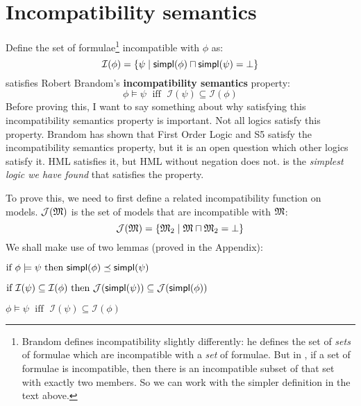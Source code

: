 \section{Incompatibility semantics}\label{incompatibility}

\NI Define the set of formulae\footnote{Brandom \cite{brandom} defines
  incompatibility slightly differently: he defines the set of
  \emph{sets} of formulae which are incompatible with a \emph{set} of
  formulae.  But in \ELABR{}, if a set of formulae is incompatible, then
  there is an incompatible subset of that set with exactly two
  members.  So we can work with the simpler definition in the text
  above.}  incompatible with $\phi$ as:
\[
\mathcal{I}(\phi) = \{ \psi \; | \; \mathsf{simpl}(\phi) \sqcap \mathsf{simpl}(\psi) = \bot \}
\]
\ELABR{} satisfies Robert Brandom's \textbf{incompatibility semantics}  property:
\[
\phi \models \psi \; \mbox{ iff } \; \mathcal{I}(\psi) \subseteq \mathcal{I}(\phi)
\]
Before proving this, I want to say something about why satisfying this incompatibility semantics property is important.
Not all logics satisfy this property. 
Brandom has shown that First Order Logic and S5 satisfy the incompatibility semantics property, but it is an open question which other logics satisfy it.
HML satisfies it, but HML without negation does not.
\ELABR{} is the \emph{simplest logic we have found} that satisfies the property.

To prove this, we need to first define a related incompatibility function on  models.
$\mathcal{J}(\frak{M})$ is the set of models that are incompatible with $\frak{M}$:
\[
\mathcal{J}(\frak{M}) = \{ \frak{M}_2 \; | \; \frak{M} \sqcap \frak{M}_2 = \bot \}
\]
We shall make use of two lemmas (proved in the Appendix):
\begin{lemma}
\label{inc1}
$\mbox{if }\phi \models \psi \mbox{ then } \mathsf{simpl}(\phi) \preceq \mathsf{simpl}(\psi)$
\end{lemma}
\begin{lemma}
\label{inc3}
$\mbox{if }\mathcal{I}(\psi) \subseteq \mathcal{I}(\phi) \mbox{ then } \mathcal{J}(\mathsf{simpl}(\psi)) \subseteq \mathcal{J}(\mathsf{simpl}(\phi))$
\end{lemma}

\begin{theorem}
$\phi \models \psi \; \mbox{ iff } \; \mathcal{I}(\psi) \subseteq \mathcal{I}(\phi)$
\end{theorem}

